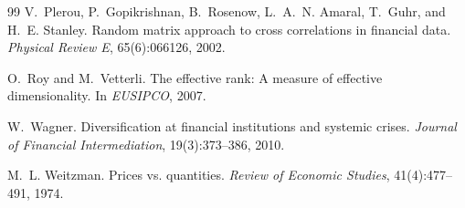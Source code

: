 \documentclass{article}
\theoremstyle{plain}
\theoremstyle{definition}
\begin{document}
\begin{thebibliography}{99}
 V.~Plerou, P.~Gopikrishnan, B.~Rosenow, L.~A.~N. Amaral, T.~Guhr, and H.~E. Stanley. Random matrix approach to cross correlations in financial data. \emph{Physical Review E}, 65(6):066126, 2002.

 O.~Roy and M.~Vetterli. The effective rank: A measure of effective dimensionality. In \emph{EUSIPCO}, 2007.

 W.~Wagner. Diversification at financial institutions and systemic crises. \emph{Journal of Financial Intermediation}, 19(3):373--386, 2010.

 M.~L. Weitzman. Prices vs. quantities. \emph{Review of Economic Studies}, 41(4):477--491, 1974.

\end{thebibliography}

\appendix



\newpage

\end{document}
